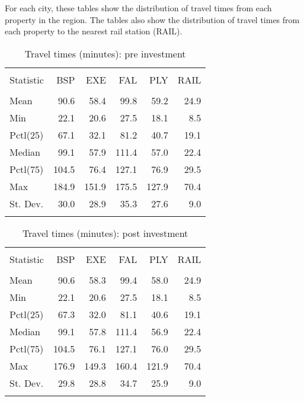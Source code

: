 \documentclass{article}\usepackage[]{graphicx}\usepackage[]{color}
\begin{document}
For each city, these tables show the distribution of travel times from each property in the region. The tables also show the distribution of travel times from each property to the nearest rail station (RAIL).

\begin{table}[!htbp] \centering 
  \caption{Travel times (minutes): pre investment} 
  \label{} 
\small 
\begin{tabular}{@{\extracolsep{2pt}}lD{.}{.}{-1} D{.}{.}{-1} D{.}{.}{-1} D{.}{.}{-1} D{.}{.}{-1} } 
\\[-1.8ex]\hline 
\hline \\[-1.8ex] 
Statistic & BSP & EXE & FAL & PLY & RAIL \\ 
\hline \\[-1.8ex] 
Mean & 90.6 & 58.4 & 99.8 & 59.2 & 24.9 \\ 
Min & 22.1 & 20.6 & 27.5 & 18.1 & 8.5 \\ 
Pctl(25) & 67.1 & 32.1 & 81.2 & 40.7 & 19.1 \\ 
Median & 99.1 & 57.9 & 111.4 & 57.0 & 22.4 \\ 
Pctl(75) & 104.5 & 76.4 & 127.1 & 76.9 & 29.5 \\ 
Max & 184.9 & 151.9 & 175.5 & 127.9 & 70.4 \\ 
St. Dev. & 30.0 & 28.9 & 35.3 & 27.6 & 9.0 \\ 
\hline \\[-1.8ex] 
\end{tabular} 
\end{table} 

\begin{table}[!htbp] \centering 
  \caption{Travel times (minutes): post investment} 
  \label{} 
\small 
\begin{tabular}{@{\extracolsep{2pt}}lD{.}{.}{-1} D{.}{.}{-1} D{.}{.}{-1} D{.}{.}{-1} D{.}{.}{-1} } 
\\[-1.8ex]\hline 
\hline \\[-1.8ex] 
Statistic & BSP & EXE & FAL & PLY & RAIL \\ 
\hline \\[-1.8ex] 
Mean & 90.6 & 58.3 & 99.4 & 58.0 & 24.9 \\ 
Min & 22.1 & 20.6 & 27.5 & 18.1 & 8.5 \\ 
Pctl(25) & 67.3 & 32.0 & 81.1 & 40.6 & 19.1 \\ 
Median & 99.1 & 57.8 & 111.4 & 56.9 & 22.4 \\ 
Pctl(75) & 104.5 & 76.1 & 127.1 & 76.0 & 29.5 \\ 
Max & 176.9 & 149.3 & 160.4 & 121.9 & 70.4 \\ 
St. Dev. & 29.8 & 28.8 & 34.7 & 25.9 & 9.0 \\ 
\hline \\[-1.8ex] 
\end{tabular} 
\end{table} 
\end{document}
